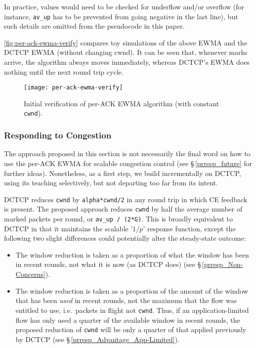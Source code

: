 In practice, values would need to be checked for underflow and/or overflow (for
instance, \texttt{av\_up} has to be prevented from going negative in the last
line), but such details are omitted from the pseudocode in this paper.

\autoref{fig:per-ack-ewma-verify} compares toy simulations of the above EWMA and
the DCTCP EWMA (without changing cwnd). It can be seen that, whenever marks
arrive, the algorithm always moves immediately, whereas DCTCP's EWMA does
nothing until the next round trip cycle.
\begin{figure}[h]
	\texttt{[image: per-ack-ewma-verify]}
	\caption{Initial verification of per-ACK EWMA algorithm (with constant \texttt{cwnd}).}\label{fig:per-ack-ewma-verify}
\end{figure}


\subsubsection{Responding to Congestion}\label{prresp_congestion_response}

The approach proposed in this section is not necessarily the final word on how
to use the per-ACK EWMA for scalable congestion control (see
\S\,\ref{prresp_future} for further ideas). Nonetheless, as a first step, we
build incrementally on DCTCP, using its teaching selectively, but not departing
too far from its intent. 

DCTCP reduces \texttt{cwnd} by \texttt{alpha*cwnd/2} in any round trip in which
CE feedback is present. The proposed approach reduces \texttt{cwnd} by half the
average number of marked packets per round, or \texttt{av\_up / (2*G)}. This is
broadly equivalent to DCTCP in that it maintains the scalable '\(1/p\)' response
function, except the following two slight differences could potentially alter
the steady-state outcome:
\begin{itemize}[nosep]
	\item The window reduction is taken as a proportion of what the window has been
	in recent rounds, not what it is now (as DCTCP does) (see
	\S\,\ref{prresp_Non-Concerns}).
	\item The window reduction is taken as a proportion of the amount of the window
	that has been \emph{used} in recent rounds, not the maximum that the flow was
	entitled to use, i.e.\ packets in flight not \texttt{cwnd}. Thus, if an
	application-limited flow has only used a quarter of the available window in
	recent rounds, the proposed reduction of \texttt{cwnd} will be only a quarter of
	that applied previously by DCTCP (see \S\,\ref{prresp_Advantage_App-Limited}).
\end{itemize}

